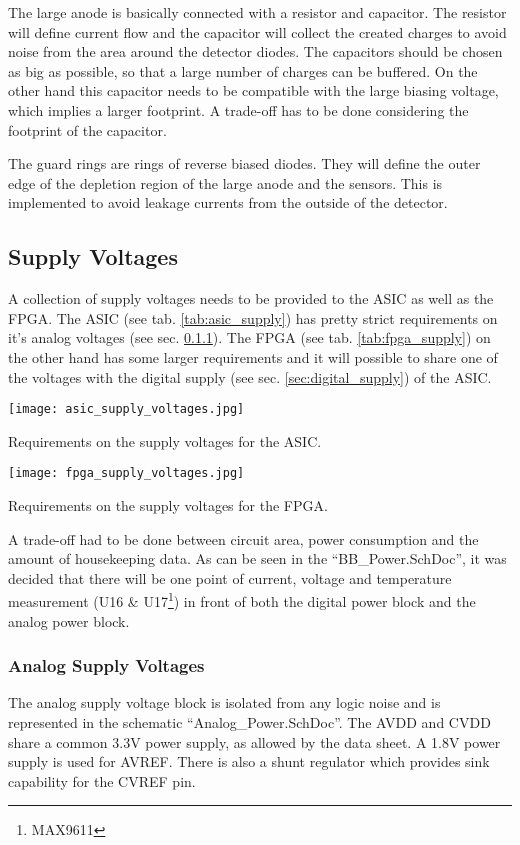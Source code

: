 The large anode is basically connected with a resistor and capacitor.
The resistor will define current flow and the capacitor will collect the created charges to avoid noise from the area around the detector diodes.
The capacitors should be chosen as big as possible, so that a large number of charges can be buffered.
On the other hand this capacitor needs to be compatible with the large biasing voltage, which implies a larger footprint.
A trade-off has to be done considering the footprint of the capacitor.

The guard rings are rings of reverse biased diodes.
They will define the outer edge of the depletion region of the large anode and the sensors.
This is implemented to avoid leakage currents from the outside of the detector.

\subsection{Supply Voltages}
\label{sec:power_supplies}
A collection of supply voltages needs to be provided to the ASIC as well as the FPGA.
The ASIC (see tab. \ref{tab:asic_supply}) has pretty strict requirements on it's analog voltages (see sec. \ref{sec:analog_supply}).
The FPGA (see tab. \ref{tab:fpga_supply}) on the other hand has some larger requirements and it will possible to share one of the voltages with the digital supply (see sec. \ref{sec:digital_supply}) of the ASIC.
\begin{table}[H]
	\centering
    \texttt{[image: asic\_supply\_voltages.jpg]}
    \caption[ASIC Supply Voltages]{Requirements on the supply voltages for the ASIC.\cite[p. 82, tab. 44]{Meier2016VATA466}}
	\label{tab:asic_supply}
\end{table}
\begin{table}[H]
	\centering
    \texttt{[image: fpga\_supply\_voltages.jpg]}
    \caption[FPGA Supply Voltages]{Requirements on the supply voltages for the FPGA.\cite[p. 2-2, tab. 2-2]{microsemi2014military}}
	\label{tab:fpga_supply}
\end{table}

A trade-off had to be done between circuit area, power consumption and the amount of housekeeping data.
As can be seen in the ``BB\_Power.SchDoc'', it was decided that there will be one point of current, voltage and temperature measurement (U16 \& U17\footnote{MAX9611}) in front of both the digital power block and the analog power block.

\subsubsection{Analog Supply Voltages}
\label{sec:analog_supply}
The analog supply voltage block is isolated from any logic noise and is represented in the schematic ``Analog\_Power.SchDoc''.
The AVDD and CVDD share a common 3.3V power supply, as allowed by the data sheet.
A 1.8V power supply is used for AVREF.
There is also a shunt regulator which provides sink capability for the CVREF pin.

